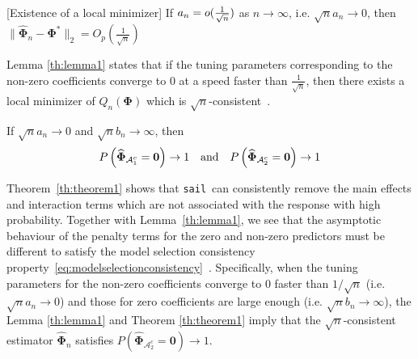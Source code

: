 \documentclass[useAMS,usenatbib,referee]{biom}
\newcommand{\sail}{\texttt{sail}}
\newcommand{\A}{\mathcal{A}}
\begin{document}

{\normalsize{}\begin{lemma}{[}Existence of a local minimizer{]}\label{th:lemma1}
		If $a_{n}=o(\text{\ensuremath{\frac{1}{\sqrt{n}}}})$ as $n\rightarrow\infty$,
		i.e. $\sqrt{n}a_{n}\to0$, then $\|\widehat{\boldsymbol{\Phi}}_{n}-\boldsymbol{\Phi}^{*}\|_{2}=O_{p}(\frac{1}{\sqrt{n}})$
\end{lemma}}{\normalsize\par}

{\normalsize{}Lemma \eqref{th:lemma1}
	states that if the tuning parameters corresponding to the non-zero
	coefficients converge to 0 at a speed faster than $\frac{1}{\sqrt{n}}$,
	then there exists a local minimizer of $Q_{n}(\boldsymbol{\Phi})$
	which is $\sqrt{n}$-consistent~\citep{wang2007regression,choi2010variable}.
}{\normalsize\par}



{\normalsize{}\begin{theorem} \label{th:theorem1}
		If $\sqrt{n}a_{n}\to0$ and $\sqrt{n}b_{n}\to\infty$, then 
		\begin{equation}
		P\left(\widehat{\boldsymbol{\Phi}}_{\mathcal{\A}_{1}^{c}}=\mathbf{0}\right)\rightarrow1\quad\text{and\ensuremath{\quad}}P\left(\widehat{\boldsymbol{\Phi}}_{\mathcal{\A}_{2}^{c}}=\mathbf{0}\right)\rightarrow1\label{eq:modelselectionconsistency}
		\end{equation}
\end{theorem}}{\normalsize\par}

{\normalsize{}Theorem~\eqref{th:theorem1}
	shows that \sail ~can consistently remove the main effects and interaction
	terms which are not associated with the response with high probability.
	Together with Lemma~\eqref{th:lemma1}, we see that the asymptotic
	behaviour of the penalty terms for the zero and non-zero predictors
	must be different to satisfy the model selection consistency property~\eqref{eq:modelselectionconsistency}~\citep{nardi2008asymptotic}.
	Specifically, when the tuning parameters for the non-zero coefficients
	converge to 0 faster than $1/\sqrt{n}$ (i.e. $\sqrt{n}a_{n}\rightarrow0$)
	and those for zero coefficients are large enough (i.e. $\sqrt{n}b_{n}\rightarrow\infty$),
	the Lemma \eqref{th:lemma1} and Theorem \eqref{th:theorem1} imply
	that the $\sqrt{n}$-consistent estimator $\widehat{\boldsymbol{\Phi}}_{n}$
	satisfies $P\left(\widehat{\boldsymbol{\Phi}}_{\mathcal{\A}_{2}^{c}}=\mathbf{0}\right)\rightarrow1$. }{\normalsize\par}
\end{document}
